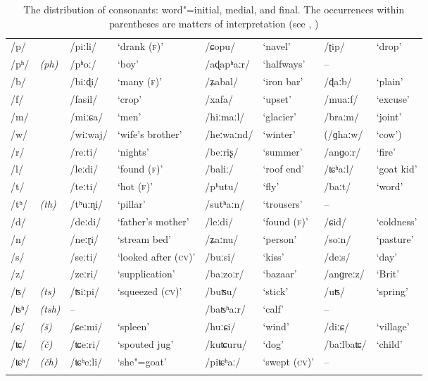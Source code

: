 \begin{sidewaystable}[p!]
\caption{The distribution of consonants: word"=initial, medial, and final.{\protect\footnotemark}
  The occurrences within parentheses are matters of interpretation (see ,
  )}
\begin{tabularx}{\textwidth}{ l@{\hspace{20pt}} l@{\hspace{20pt}} Q l@{\hspace{20pt}} Q Q Q Q }
\lsptoprule
/p/ &
&
/piːli/ &
`drank (\textsc{f)}' &
/ɕopu/ &
`navel' &
/ʈip/ &
`drop'\\
/pʰ/ &
\textit{(ph)} &
/pʰoː/ &
`boy' &
/aɖapʰaːr/ &
`halfways' &
-- &
\\
/b/ &
&
/biːɖi/ &
`many (\textsc{f)}' &
/ʑabal/ &
`iron bar' &
/ɖaːb/ &
`plain'\\
/f/ &
&
/fasil/ &
`crop' &
/xafa/ &
`upset' &
/muaːf/ &
`excuse'\\
/m/ &
&
/miːɕa/ &
`men' &
/hiːmaːl/ &
`glacier' &
/braːm/ &
`joint'\\
/w/ &
&
/wiːwaj/ &
`wife's brother' &
/heːwaːnd/ &
`winter' &
(/ɡhaːw/ &
`cow')\\
/r/ &
&
/reːti/ &
`nights' &
/beːriʂ/ &
`summer' &
/anɡoːr/ &
`fire'\\
/l/ &
&
/leːdi/ &
`found (\textsc{f)}' &
/baliː/ &
`roof end' &
/ʨʰaːl/ &
`goat kid'\\
/t/ &
&
/teːti/ &
`hot (\textsc{f)}' &
/pʰutu/ &
`fly' &
/baːt/ &
`word'\\
/tʰ/ &
\textit{(th)} &
/tʰuːɳi/ &
`pillar' &
/sutʰaːn/ &
`trousers' &
-- &
\\
/d/ &
&
/deːdi/ &
`father's mother' &
/leːdi/ &
`found (\textsc{f)}' &
/ɕid/ &
`coldness'\\
/n/ &
&
/neːɽi/ &
`stream bed' &
/ʑaːnu/ &
`person' &
/soːn/ &
`pasture'\\
/s/ &
&
/seːti/ &
`looked after (\textsc{cv)}' &
/buːsi/ &
`kiss' &
/deːs/ &
`day'\\
/z/ &
&
/zeːri/ &
`supplication' &
/baːzoːr/ &
`bazaar' &
/anɡreːz/ &
`Brit'\\
/ʦ/ &
\textit{(ts)} &
/ʦiːpi/ &
`squeezed (\textsc{cv)}' &
/buʦu/ &
`stick' &
/uʦ/ &
`spring'\\
/ʦʰ/ &
\textit{(tsh)} &
-- &
&
/baʦʰaːr/ &
`calf' &
-- &
\\
/ɕ/ &
\textit{(š)} &
/ɕeːmi/ &
`spleen' &
/huːɕi/ &
`wind' &
/diːɕ/ &
`village'\\
/ʨ/ &
\textit{(č)} &
/ʨeːri/ &
`spouted jug' &
/kuʨuru/ &
`dog' &
/baːlbaʨ/ &
`child'\\
/ʨʰ/ &
\textit{(čh)} &
/ʨʰeːli/ &
`she"=goat' &
/piʨʰaː/ &
`swept  (\textsc{cv)}' &
-- &
\\\lspbottomrule
\end{tabularx}
\end{sidewaystable}

